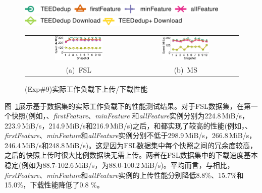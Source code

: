 \begin{figure}[!htb]
    \centering
    \includegraphics[height=0.2in]{pic/featurespy/plot/performance/LANTrace/trace_legend_upload.pdf}\\
    \includegraphics[height=0.2in]{pic/featurespy/plot/performance/LANTrace/trace_legend_download.pdf}\\
    \vspace{3pt}
    \begin{tabular}{@{\ }c@{\ }c}
        \includegraphics[width=0.47\textwidth]{pic/featurespy/plot/performance/LANTrace/trace_fsl.pdf} &
        \includegraphics[width=0.47\textwidth]{pic/featurespy/plot/performance/LANTrace/trace_ms.pdf}    \\
        \mbox{\small (a) FSL}                                                                          &
        \mbox{\small (b) MS}                                                                             \\
    \end{tabular}
    \caption{(Exp\#9)实际工作负载下上传/下载性能}
    \label{fig:featurespy-traceDrivenThroughput}
\end{figure}

图~\ref{fig:featurespy-traceDrivenThroughput}展示基于数据集的实际工作负载下\prototype 的性能测试结果。对于FSL数据集，在第一个快照(例如，\sysnameS、\textit{firstFeature}、\textit{minFeature} 和\textit{allFeature}实例分别为224.8\,MiB/s，223.9\,MiB/s，214.9\,MiB/s和216.9\,MiB/s)之后，\sysnameS 和\prototype 都实现了较高的性能(例如，\sysnameS、\textit{firstFeature}、\textit{minFeature}和\textit{allFeature}实例分别不低于298.9\,MiB/s，266.8\,MiB/s，246.4\,MiB/s和248.8\,MiB/s)。这是因为FSL数据集中每个快照之间的冗余度较高，之后的快照上传时很大比例数据块无需上传。两者在FSL数据集中的下载速度基本稳定(例如\sysnameS 为88.7-102.6\,MiB/s，\prototype 为88.0-100.2\,MiB/s)。平均而言，与\sysnameS 相比，\textit{firstFeature}、\textit{minFeature}和\textit{allFeature}实例的上传性能分别降低8.8\%、15.7\%和15.0\%，下载性能降低了0.8 \%。

